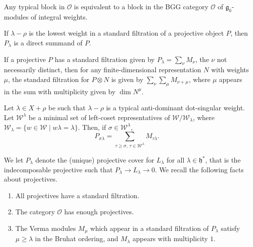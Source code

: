 \begin{proposition}[Gorelik] \label{prop3}
Any typical block in $\mathcal{O}$ is equivalent to a block in the BGG category $\mathcal{O}$ of $\mathfrak{g}_0$-modules of integral weights.
\end{proposition}





\begin{lemma}\label{lemma:2}
  If $\lambda - \rho$ is the lowest weight in a standard filtration of a projective object $P$, then $P_\lambda$ is a direct summand of $P$.
\end{lemma}



\begin{proposition} \label{prop:4}
If a projective $P$ has a standard filtration given by $P_\lambda = \sum_\nu M_\nu$, the $\nu$ not necessarily distinct, then for any finite-dimensional representation $N$ with weights $\mu$, the standard filtration for $P \otimes N$ is given by $\sum_\nu \sum_\mu M_{\nu + \mu}$, where $\mu$ appears in the sum with multiplicity given by $\dim N^\mu$.
\end{proposition}




\begin{theorem} \label{thm:4}
  \cite{gorelik2002annihilation} Let $\lambda \in X + \rho$ be such that $\lambda - \rho$ is a typical anti-dominant dot-singular weight. Let $\mathcal{W}^\lambda$ be a minimal set of left-coset representatives of $\mathcal{W}/\mathcal{W}_\lambda$, where $\mathcal{W}_\lambda = \{w \in \mathcal{W} \mid w\lambda = \lambda\}$. Then, if $\sigma \in \mathcal{W}^\lambda$,
\[
P_{\sigma\lambda} = \sum_{\tau \geq \sigma,\, \tau \in \mathcal{W}^\lambda} M_{\tau\lambda}. \tag{2.2}
\]
\end{theorem}

\begin{theorem}
 We let $P_\lambda$ denote the (unique) projective cover for $L_\lambda$ for all $\lambda \in \mathfrak{h}^*$, that is the indecomposable projective such that $P_\lambda \to L_\lambda \to 0$. We recall the following facts about projectives.

\begin{enumerate} \label{cor:1}
    \item All projectives have a standard filtration.
    \item The category $\mathcal{O}$ has enough projectives.
    \item The Verma modules $M_\mu$ which appear in a standard filtration of $P_\lambda$ satisfy $\mu \geq \lambda$ in the Bruhat ordering, and $M_\lambda$ appears with multiplicity $1$.
\end{enumerate}
\end{theorem}


